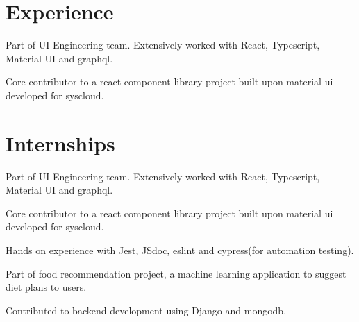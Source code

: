 \documentclass[]{manoj-resume}
\begin{document}
\begin{minipage}[t]{0.66\textwidth} 


\section{Experience}

\vspace{\topsep} %
\begin{tightemize}
\item Part of UI Engineering team. Extensively worked with React, Typescript, Material UI and graphql.
\item Core contributor to a react component library project built upon material ui developed for syscloud. 
\end{tightemize}
\sectionsep

\section{Internships}

\vspace{\topsep} %
\begin{tightemize}
\item Part of UI Engineering team. Extensively worked with React, Typescript, Material UI and graphql.
\item Core contributor to a react component library project built upon material ui developed for syscloud. 
\item Hands on experience with Jest, JSdoc, eslint and cypress(for automation testing).
\end{tightemize}
\sectionsep

\begin{tightemize}
\item Part of food recommendation project, a machine learning application to suggest diet plans to users.
\item Contributed to backend development using Django and mongodb.
\end{tightemize}
\sectionsep


\end{minipage}
\end{document}
